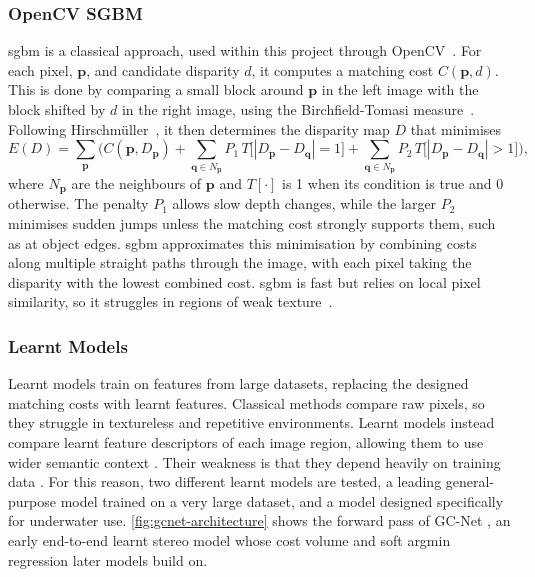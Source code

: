 \subsubsection{OpenCV SGBM}
\gls{sgbm} is a classical approach, used within this
project through OpenCV~\cite{opencvSGBMLink}. For each pixel, $\mathbf{p}$, and
candidate disparity $d$, it computes a matching cost $C(\mathbf{p}, d)$. This is done by
comparing a small block around $\mathbf{p}$ in the left image with the block
shifted by $d$ in the right image, using the Birchfield-Tomasi
measure~\cite{birchfield1998}. Following
Hirschmüller~\cite[Eq.~(11)]{hirschmullerStereoProcessingSemiglobal2008}, it
then determines the disparity map $D$ that minimises
\begin{equation}
    E(D) = \sum_{\mathbf{p}} \Big( C(\mathbf{p}, D_\mathbf{p})
    + \sum_{\mathbf{q} \in N_\mathbf{p}} P_1 \, T\big[|D_\mathbf{p} - D_\mathbf{q}| = 1\big]
    + \sum_{\mathbf{q} \in N_\mathbf{p}} P_2 \, T\big[|D_\mathbf{p} - D_\mathbf{q}| > 1\big] \Big),
    \label{eq:sgm_energy}
\end{equation}
where $N_\mathbf{p}$ are the neighbours of $\mathbf{p}$ and $T[\cdot]$ is 1
when its condition is true and 0 otherwise. The penalty $P_1$ allows
slow depth changes, while the larger $P_2$ minimises sudden jumps unless
the matching cost strongly supports them, such as at object edges. \Gls{sgbm}
approximates this minimisation by combining costs along multiple straight
paths through the image, with each pixel taking the disparity with the lowest
combined cost. \Gls{sgbm} is fast but relies on local pixel similarity, so it
struggles in regions of weak texture~\cite{kendallEndtoEndLearningGeometry2017}.


\subsubsection{Learnt Models}
Learnt models train on features from large datasets, replacing the designed matching costs with learnt features. Classical methods compare raw pixels, so they struggle in textureless
and repetitive environments. Learnt models instead compare learnt feature descriptors of each image region,
allowing them to use wider semantic context \cite{kendallEndtoEndLearningGeometry2017}.
Their weakness is that they depend heavily on training data \cite{wenFoundationStereoZeroShotStereo2025}.
For this reason, two different learnt models are tested, a leading general-purpose model trained on a very large dataset, and a model designed specifically for underwater use. 
\autoref{fig:gcnet-architecture} shows the forward pass of GC-Net \cite{kendallEndtoEndLearningGeometry2017}, 
an early end-to-end learnt stereo model whose cost volume and soft argmin regression later models build on.


